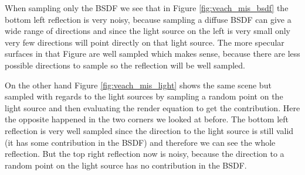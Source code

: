 When sampling only the BSDF we see that in Figure \ref{fig:veach_mis_bsdf} the bottom left reflection is very noisy,
because sampling a diffuse BSDF can give a wide range of directions
and since the light source on the left is very small only very few directions will point directly on that light source.
The more specular surfaces in that Figure are well sampled which makes sense,
because there are less possible directions to sample so the reflection will be well sampled.

On the other hand Figure \ref{fig:veach_mis_light} shows the same scene but sampled with regards to the light sources
by sampling a random point on the light source and then evaluating the render equation to get the contribution.
Here the opposite happened in the two corners we looked at before.
The bottom left reflection is very well sampled
since the direction to the light source is still valid (it has some contribution in the BSDF) and therefore we can see the whole reflection.
But the top right reflection now is noisy,
because the direction to a random point on the light source has no contribution in the BSDF.

